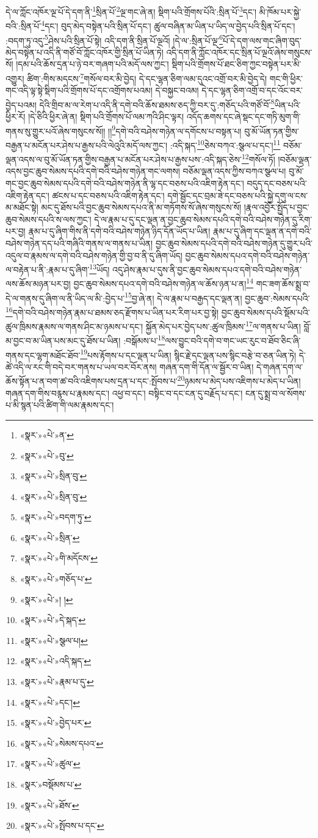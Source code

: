 དེ་ལ་ཀློང་འཁོར་ལྔ་པོ་དེ་དག་ནི་\footnote{«སྣར་»«པེ་»ན་}སྲིན་པོ་\footnote{«སྣར་»«པེ་»བུ་}ལྔ་གང་ཞེ་ན། སྡིག་པའི་གྲོགས་པོའི་:སྲིན་པོ་\footnote{«སྣར་»«པེ་»སྲིན་བུ་}དང་། མི་ཁོམ་པར་སྐྱེ་བའི་:སྲིན་པོ་\footnote{«སྣར་»«པེ་»སྲིན་བུ་}དང་། བུད་མེད་བསྟེན་པའི་སྲིན་པོ་དང་། ཚུལ་བཞིན་མ་ཡིན་པ་ཡིད་ལ་བྱེད་པའི་སྲིན་པོ་དང་། :བདག་ཏུ་འདུ་\footnote{«སྣར་»«པེ་»བདག་ཏུ་}ཤེས་པའི་སྲིན་པོ་སྟེ། འདི་དག་ནི་སྲིན་པོ་ལྔའོ། །དེ་ལ་:སྲིན་པོ་ལྔ་\footnote{«སྣར་»«པེ་»སྲིན་}པོ་དེ་དག་ལས་གང་ཞིག་བུད་མེད་བསྟེན་པ་འདི་ནི་གཙོ་བོ་ཀློང་འཁོར་གྱི་སྲིན་པོ་ཡིན་ཏེ། འདི་དག་ནི་ཀློང་འཁོར་དང་སྲིན་པོ་ལྔའོ་ཞེས་གསུངས་སོ། །དམ་པའི་ཆོས་དྲན་པ་ཉེ་བར་གཞག་པའི་མདོ་ལས་ཀྱང་། སྡིག་པའི་གྲོགས་པོ་ཐང་ཅིག་ཀྱང་བསྟེན་པར་མི་འགྱུར། ཚིག་:གིས་མདངས་\footnote{«སྣར་»«པེ་»གི་མདོངས་}གསོལ་བར་མི་བྱེད། དེ་དང་ལྷན་ཅིག་ལམ་དུའང་འགྲོ་བར་མི་བྱེད་དེ། གང་གི་ཕྱིར་གང་འདི་ལྟ་སྟེ་སྡིག་པའི་གྲོགས་པོ་དང་འགྲོགས་པའམ། དེ་བསྐྱང་བའམ། དེ་དང་ལྷན་ཅིག་འགྲོ་བ་དང་འོང་བར་བྱེད་པའམ། དེའི་གྲིབ་མ་ལ་རེག་པ་འདི་ནི་དགེ་བའི་ཆོས་ཐམས་ཅད་ཀྱི་བར་དུ་:གཅོད་པའི་གཙོ་བོ་\footnote{«སྣར་»«པེ་»གཅོད་པ་}ཡིན་པའི་ཕྱིར་རོ། །དེ་ཅིའི་ཕྱིར་ཞེ་ན། སྡིག་པའི་གྲོགས་པོ་ལམ་ཀའི་ཤིང་ལྟར། འདོད་ཆགས་དང་ཞེ་སྡང་དང་གཏི་མུག་གི་གནས་སུ་གྱུར་པའོ་ཞེས་གསུངས་སོ།། །།\footnote{«སྣར་»«པེ་»། །}དགེ་བའི་བཤེས་གཉེན་ལ་དགོངས་པ་བསྟན་པ། བུ་མོ་ཡོན་ཏན་གྱིས་བརྒྱན་པ་མངོན་པར་ཤེས་པ་རྒྱས་པའི་ལེའུའི་མདོ་ལས་ཀྱང་། :འདི་སྐད་\footnote{«སྣར་»«པེ་»དེ་སྐད་}ཅེས་བཀའ་:སྩལ་པ་དང་།\footnote{«སྣར་»«པེ་»སྩལ་པ།} བཅོམ་ལྡན་འདས་ལ་བུ་མོ་ཡོན་ཏན་གྱིས་བརྒྱན་པ་མངོན་པར་ཤེས་པ་རྒྱས་པས་:འདི་སྐད་ཅེས་\footnote{«སྣར་»«པེ་»འདི་སྐད་}གསོལ་ཏོ། །བཅོམ་ལྡན་འདས་བྱང་ཆུབ་སེམས་དཔའི་དགེ་བའི་བཤེས་གཉེན་གང་ལགས། བཅོམ་ལྡན་འདས་ཀྱིས་བཀའ་སྩལ་པ། བུ་མོ་གང་བྱང་ཆུབ་སེམས་དཔའི་དགེ་བའི་བཤེས་གཉེན་ནི་ལྷ་དང་བཅས་པའི་འཇིག་རྟེན་དང་། བདུད་དང་བཅས་པའི་འཇིག་རྟེན་དང་། ཚངས་པ་དང་བཅས་པའི་འཇིག་རྟེན་དང་། དགེ་སྦྱོང་དང་བྲམ་ཟེ་དང་བཅས་པའི་སྐྱེ་དགུ་ལ་ངས་མ་མཐོང་སྟེ། མང་དུ་ཐོས་པའི་བྱང་ཆུབ་སེམས་དཔའ་ནི་མ་གཏོགས་སོ་ཞེས་གསུངས་སོ། །རྣལ་འབྱོར་སྤྱོད་པ་བྱང་ཆུབ་སེམས་དཔའི་ས་ལས་ཀྱང་། དེ་ལ་རྣམ་པ་དུ་དང་ལྡན་ན་བྱང་ཆུབ་སེམས་དཔའི་དགེ་བའི་བཤེས་གཉེན་དུ་རིག་པར་བྱ། རྣམ་པ་དུ་ཞིག་གིས་ནི་དགེ་བའི་བཤེས་གཉེན་ཉིད་དོན་ཡོད་པ་ཡིན། རྣམ་པ་དུ་ཞིག་དང་ལྡན་ན་དགེ་བའི་བཤེས་གཉེན་དད་པའི་གཞིའི་གནས་ལ་གནས་པ་ཡིན། བྱང་ཆུབ་སེམས་དཔའི་དགེ་བའི་བཤེས་གཉེན་དུ་གྱུར་པའི་འདུལ་བ་རྣམས་ལ་དགེ་བའི་བཤེས་གཉེན་གྱི་བྱ་བ་ནི་དུ་ཞིག་ཡོད། བྱང་ཆུབ་སེམས་དཔའ་དགེ་བའི་བཤེས་གཉེན་ལ་བརྟེན་པ་ནི་:རྣམ་པ་དུ་ཞིག་\footnote{«སྣར་»«པེ་»རྣམ་པ་དུ་}ཡོད། འདུ་ཤེས་རྣམ་པ་དུས་ནི་བྱང་ཆུབ་སེམས་དཔའ་དགེ་བའི་བཤེས་གཉེན་ལས་ཆོས་མཉན་པར་བྱ། བྱང་ཆུབ་སེམས་དཔའ་དགེ་བའི་བཤེས་གཉེན་ལ་ཆོས་ཉན་པ་ན།\footnote{«སྣར་»«པེ་»དང་།} གང་ཟག་ཆོས་སྨྲ་བ་དེ་ལ་གནས་དུ་ཞིག་ལ་ནི་ཡིད་ལ་མི་:བྱེད་པ་\footnote{«སྣར་»«པེ་»བྱེད་པར་}བྱ་ཞེ་ན། དེ་ལ་རྣམ་པ་བརྒྱད་དང་ལྡན་ན། བྱང་ཆུབ་:སེམས་དཔའི་\footnote{«སྣར་»«པེ་»སེམས་དཔའ་}དགེ་བའི་བཤེས་གཉེན་རྣམ་པ་ཐམས་ཅད་རྫོགས་པ་ཡིན་པར་རིག་པར་བྱ་སྟེ། བྱང་ཆུབ་སེམས་དཔའི་སྡོམ་པའི་ཚུལ་ཁྲིམས་རྣམས་ལ་གནས་ཤིང་མ་ཉམས་པ་དང་། སྐྱོན་མེད་པར་བྱེད་པས་:ཚུལ་ཁྲིམས་\footnote{«སྣར་»«པེ་»ཚུལ་}ལ་གནས་པ་ཡིན། བློ་མ་བྱང་བ་མ་ཡིན་པས་མང་དུ་ཐོས་པ་ཡིན། :བསྒོམས་པ་\footnote{«སྣར་»བསྡོམས་པ་}ལས་བྱུང་བའི་དགེ་བ་གང་ཡང་རུང་བ་ཐོབ་ཅིང་ཞི་གནས་དང་ལྷག་མཐོང་ཐོབ་\footnote{«སྣར་»«པེ་»ཐོས་}པས་རྟོགས་པ་དང་ལྡན་པ་ཡིན། སྙིང་རྗེ་དང་ལྡན་པས་སྙིང་བརྩེ་བ་ཅན་ཡིན་ཏེ། དེ་ཚེ་འདི་ལ་རང་གི་བདེ་བར་གནས་པ་ཡལ་བར་བོར་ནས། གཞན་དག་གི་དོན་ལ་སྦྱོར་བ་ཡིན། དེ་གཞན་དག་ལ་ཆོས་སྟོན་པ་ན་བག་ཚ་བའི་འཇིགས་པས་དྲན་པ་དང་:སྤོབས་པ་\footnote{«སྣར་»«པེ་»སྤོབས་པ་དང་}ཉམས་པ་མེད་པས་འཇིགས་པ་མེད་པ་ཡིན། གཞན་དག་གིས་བརྙས་པ་རྣམས་དང་། འཕྱ་བ་དང་། བསྟིང་བ་དང་ངན་དུ་བརྗོད་པ་དང་། ངན་དུ་སྨྲ་བ་ལ་སོགས་པ་མི་སྙན་པའི་ཚིག་གི་ལམ་རྣམས་དང་། 